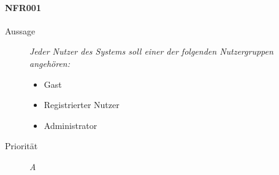 \paragraph{NFR001}
\begin{description}
  \item[Aussage] \textit{Jeder Nutzer des Systems soll einer der folgenden Nutzergruppen angeh\"oren:}
  \begin{itemize}
	      \item Gast
	      \item Registrierter Nutzer
	      \item Administrator
   	   \end{itemize}
  \item[Priorit\"at] \textit{A}
\end{description}
